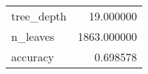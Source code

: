 \begin{tabular}{lr}
\toprule
 &  \\
\midrule
tree\_depth & 19.000000 \\
n\_leaves & 1863.000000 \\
accuracy & 0.698578 \\
\bottomrule
\end{tabular}